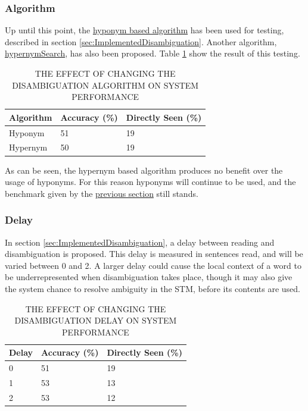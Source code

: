 \documentclass[]{article}
\begin{document}
\subsubsection{Algorithm}
\label{sec:EvDisAlgorithm}
Up until this point, the \hyperref[lst:hyponymSearch]{hyponym based algorithm} has been used for testing, described in section \ref{sec:ImplementedDisambiguation}. Another algorithm, \hyperref[lst:hypernymSearch]{hypernymSearch}, has also been proposed. Table \ref{table:Algorithm} show the result of this testing.

\begin{table}
\begin{center}
\begin{tabular}{|p{7em}|p{7em}|p{7em}|}
	\hline
	Algorithm & Accuracy (\%) & Directly Seen (\%) \\
	\hline
	Hyponym & 51 & 19\\
	\hline
	Hypernym & 50 & 19\\
	\hline
\end{tabular}
\end{center}
\caption{THE EFFECT OF CHANGING THE DISAMBIGUATION ALGORITHM ON SYSTEM PERFORMANCE}
\label{table:Algorithm}
\end{table}

As can be seen, the hypernym based algorithm produces no benefit over the usage of hyponyms. For this reason hyponyms will continue to be used, and the benchmark given by the \hyperref[sec:EvEpisodicBuffer]{previous section} still stands. 

\subsubsection{Delay}
\label{sec:EvDisDelay}
In section \ref{sec:ImplementedDisambiguation}, a delay between reading and disambiguation is proposed. This delay is measured in sentences read, and will be varied between 0 and 2. A larger delay could cause the local context of a word to be underrepresented when disambiguation takes place, though it may also give the system chance to resolve ambiguity in the STM, before its contents are used.

\begin{table}
\begin{center}
\begin{tabular}{|p{2em}|p{7em}|p{7em}|}
	\hline
	Delay & Accuracy (\%) & Directly Seen (\%) \\
	\hline
	0 & 51 & 19\\
	\hline
	1 & 53 & 13\\
	\hline
	2 & 53 & 12\\
	\hline
\end{tabular}
\end{center}
\caption{THE EFFECT OF CHANGING THE DISAMBIGUATION DELAY ON SYSTEM PERFORMANCE}
\label{table:Delay}
\end{table}
\end{document}
